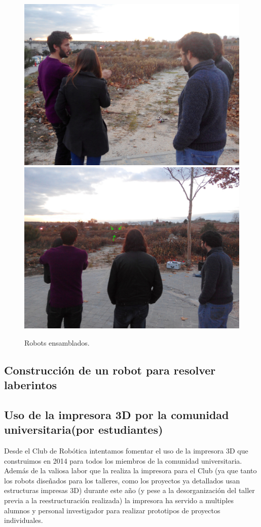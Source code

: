 \documentclass[12pt,twoside]{report}
\begin{document}
\begin{figure}[hbtp]
\centerline{\includegraphics[width=0.4\linewidth]{fotos/2015-12-11_PruebaVuelo_JaimeCrisPabloRafa.jpg} \includegraphics[width=0.4\linewidth]{fotos/2015-12-11_PruebaVuelo_CrisJaimeRafaPablo.jpg}}
\caption*{
Robots ensamblados.
}
\end{figure}

\subsection{Construcción de un robot para resolver laberintos}





\subsection{Uso de la impresora 3D por la comunidad universitaria(por estudiantes)}
Desde el Club de Robótica intentamos fomentar el uso de la impresora 3D que construimos en 2014 para todos los miembros de la comunidad universitaria.
Además de la valiosa labor que la realiza la impresora para el Club (ya que tanto los robots diseñados para los talleres, como los proyectos ya detallados usan estructuras impresas 3D) durante este año (y pese a la desorganización del taller previa a la reestructuración realizada) la impresora ha servido a multiples alumnos y personal investigador para realizar prototipos de proyectos individuales.
\end{document}
